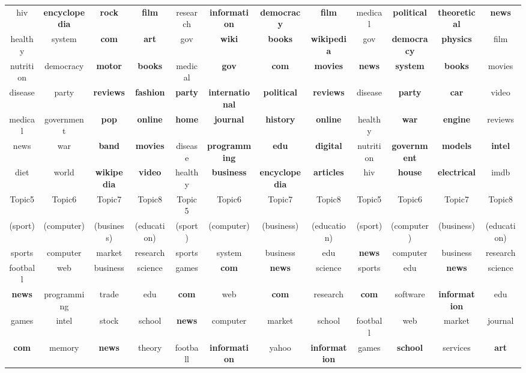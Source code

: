\documentclass[10pt,journal,compsoc]{IEEEtran}
\begin{document}
{\begin{table}
{\begin{tabular}{|cccc|cccc|cccc|}
    {hiv}&{\textbf{encyclopedia}}&{\textbf{rock}}&\textbf{film}&{research}&\textbf{information}&{\textbf{democracy}}&\textbf{film}&{medical}&\textbf{political}&{\textbf{theoretical}}&\textbf{news}\\
    {healthy}&{system}&\textbf{com}&\textbf{art}&{gov}&\textbf{wiki}&{\textbf{books}}&\textbf{wikipedia}&{gov}&\textbf{democracy}&\textbf{physics}&{film}\\
    {nutrition}&{democracy}&\textbf{motor}&\textbf{books}&{medical}&\textbf{gov}&{\textbf{com}}&\textbf{movies}&\textbf{news}&\textbf{system}&\textbf{books}&{movies}\\
    {disease}&{party}&{\textbf{reviews}}&\textbf{fashion}&{\textbf{party}}&\textbf{international}&{\textbf{political}}&\textbf{reviews}&{disease}&\textbf{party}&\textbf{car}&{video}\\
    {medical}&{government}&{\textbf{pop}}&{\textbf{online}}&{\textbf{home}}&\textbf{journal}&{\textbf{history}}&\textbf{online}&{healthy}&\textbf{war}&\textbf{engine}&{reviews}\\
    {news}&{war}&{\textbf{band}}&\textbf{movies}&{disease}&\textbf{programming}&{\textbf{edu}}&\textbf{digital}&{nutrition}&\textbf{government}&\textbf{models}&{\textbf{intel}}\\
    {diet}&{world}&{\textbf{wikipedia}}&\textbf{video}&{healthy}&\textbf{business}&{\textbf{encyclopedia}}&\textbf{articles}&{hiv}&\textbf{house}&\textbf{electrical}&{imdb}\\
    \hline
    {Topic5}&{Topic6}&{Topic7}&{Topic8}&{Topic5}&{Topic6}&{Topic7}&{Topic8}&{Topic5}&{Topic6}&{Topic7}&{Topic8}\\
    {(sport)}&{(computer)}&{(business)}&{(education)}&{(sport)}&{(computer)}&{(business)}&{(education)}&{(sport)}&{(computer)}&{(business)}&{(education)}\\
    \hline
    {sports}&{computer}&{market}&{research}&{sports}&{system}&{business}&{edu}&\textbf{news}&{computer}&{business}&{research}\\
    {football}&{web}&{business}&{science}&{games}&\textbf{com}&\textbf{news}&{science}&{sports}&{edu}&\textbf{news}&{science}\\
    \textbf{news}&{programming}&{trade}&{edu}&\textbf{com}&{web}&\textbf{com}&{research}&\textbf{com}&{software}&\textbf{information}&{edu}\\
    {games}&{intel}&{stock}&{school}&\textbf{news}&{computer}&{market}&{school}&{football}&{web}&{market}&{journal}\\
    \textbf{com}&{memory}&\textbf{news}&{theory}&{football}&\textbf{information}&{yahoo}&\textbf{information}&{games}&{\textbf{school}}&{services}&{\textbf{art}}\\

\end{tabular}}
\end{table}}
\end{document}
